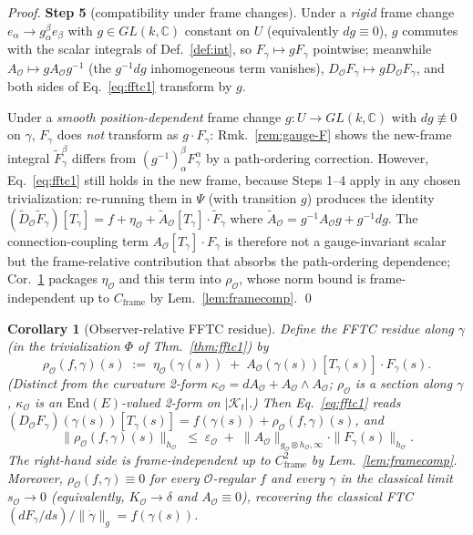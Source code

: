 \documentclass[11pt]{article}
\newtheorem{corollary}{Corollary}
\newcommand{\Kt}{\mathcal{K}_t}
\newcommand{\sO}{s_{\mathcal{O}}}  %
\newcommand{\Obs}{\mathcal{O}}
\newcommand{\Eps}{\varepsilon_{\Obs}}
\newcommand{\kappaO}{\kappa_{\Obs}}
\newcommand{\resO}{\rho_{\Obs}}
\newcommand{\AO}{A_{\Obs}}
\newcommand{\gO}{g_{\Obs}}
\newcommand{\hO}{h_{\Obs}}
\newcommand{\KO}{K_{\Obs}}
\newcommand{\DO}{D_{\Obs}}
\newcommand{\EE}{E}
\newcommand{\End}{\mathrm{End}}
\newcommand{\Cframe}{C_{\mathrm{frame}}}
\begin{document}
\begin{proof}
\smallskip
\noindent\textbf{Step 5} (compatibility under frame changes).
Under a \emph{rigid} frame change $e_\alpha \to g^\beta_\alpha e_\beta$
with $g \in GL(k, \mathbb{C})$ constant on $U$
(equivalently $dg \equiv 0$), $g$ commutes with the scalar integrals
of Def.~\ref{def:int}, so $F_\gamma \mapsto g F_\gamma$ pointwise;
meanwhile $\AO \mapsto g \AO g^{-1}$ (the $g^{-1}dg$ inhomogeneous
term vanishes), $\DO F_\gamma \mapsto g \DO F_\gamma$, and both sides
of Eq.~\eqref{eq:fftc1} transform by $g$.

Under a \emph{smooth position-dependent} frame change $g: U \to GL(k, \mathbb{C})$
with $dg \not\equiv 0$ on $\gamma$, $F_\gamma$ does \emph{not}
transform as $g \cdot F_\gamma$: Rmk.~\ref{rem:gauge-F} shows the
new-frame integral $\tilde F_\gamma^\beta$ differs from
$(g^{-1})^\beta_\alpha F_\gamma^\alpha$ by a path-ordering correction.
However, Eq.~\eqref{eq:fftc1} still holds in the new frame, because
Steps 1--4 apply in any chosen trivialization: re-running them in
$\Psi$ (with transition $g$) produces the identity
$(\tilde\DO \tilde F_\gamma)[T_\gamma] = f + \eta_\Obs + \tilde\AO[T_\gamma] \cdot \tilde F_\gamma$
where $\tilde\AO = g^{-1}\AO g + g^{-1}dg$. The connection-coupling
term $\AO[T_\gamma] \cdot F_\gamma$ is therefore not a gauge-invariant
scalar but the frame-relative contribution that absorbs the
path-ordering dependence; Cor.~\ref{cor:torsion} packages
$\eta_\Obs$ and this term into $\resO$, whose norm bound is
frame-independent up to $\Cframe$ by Lem.~\ref{lem:framecomp}.
\qed
\end{proof}

\begin{corollary}[Observer-relative FFTC residue]
\label{cor:torsion}
Define the \emph{FFTC residue} along $\gamma$ (in the trivialization
$\Phi$ of Thm.~\ref{thm:fftc1}) by
\[
\resO(f, \gamma)(s) \;:=\; \eta_\Obs(\gamma(s)) \;+\; \AO(\gamma(s))[T_\gamma(s)] \cdot F_\gamma(s).
\]
(Distinct from the curvature 2-form $\kappaO = d\AO + \AO \wedge \AO$;
$\resO$ is a section along $\gamma$, $\kappaO$ is an
$\End(\EE)$-valued 2-form on $|\Kt|$.) Then
Eq.~\eqref{eq:fftc1} reads
$(\DO F_\gamma)(\gamma(s))[T_\gamma(s)] = f(\gamma(s)) + \resO(f, \gamma)(s)$,
and
\[
\|\resO(f, \gamma)(s)\|_{\hO}
\;\leq\; \Eps \;+\; \|\AO\|_{\gO \otimes \hO, \infty} \cdot \|F_\gamma(s)\|_{\hO}.
\]
The right-hand side is frame-independent up to $\Cframe^2$ by
Lem.~\ref{lem:framecomp}. Moreover, $\resO(f, \gamma) \equiv 0$ for
every $\Obs$-regular $f$ and every $\gamma$ in the classical limit
$\sO \to 0$ (equivalently, $\KO \to \delta$ and $\AO \equiv 0$),
recovering the classical FTC
$(dF_\gamma/ds)/\|\dot\gamma\|_g = f(\gamma(s))$.
\end{corollary}
\end{document}
